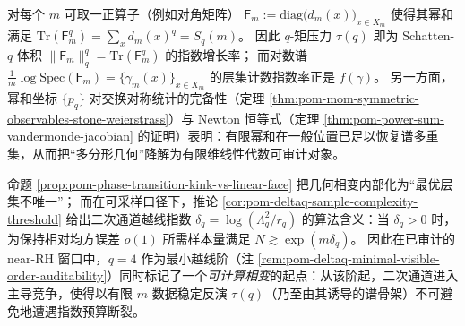 \begin{remark}\label{rem:pom-matrixization-spectrum-density-schatten-det}
对每个 \(m\) 可取一正算子（例如对角矩阵）
\(
\mathsf F_m:=\mathrm{diag}\bigl(d_m(x)\bigr)_{x\in X_m}
\)
使得其幂和满足
\(
\mathrm{Tr}(\mathsf F_m^q)=\sum_x d_m(x)^q=S_q(m)
\)。
因此 \(q\)-矩压力 \(\tau(q)\) 即为 Schatten-\(q\) 体积 \(\|\mathsf F_m\|_q^q=\mathrm{Tr}(\mathsf F_m^q)\) 的指数增长率；
而对数谱
\(
\frac{1}{m}\log\mathrm{Spec}(\mathsf F_m)=\{\gamma_m(x)\}_{x\in X_m}
\)
的层集计数指数率正是 \(f(\gamma)\)。
另一方面，幂和坐标 \(\{p_q\}\) 对交换对称统计的完备性（定理 \ref{thm:pom-mom-symmetric-observables-stone-weierstrass}）与 Newton 恒等式（定理 \ref{thm:pom-power-sum-vandermonde-jacobian} 的证明）表明：有限幂和在一般位置已足以恢复谱多重集，从而把“多分形几何”降解为有限维线性代数可审计对象。
\end{remark}

\begin{remark}\label{rem:pom-computational-phase-transition-deltaq}
命题 \ref{prop:pom-phase-transition-kink-vs-linear-face} 把几何相变内部化为“最优层集不唯一”；
而在可采样口径下，推论 \ref{cor:pom-deltaq-sample-complexity-threshold} 给出二次通道越线指数
\(\delta_q=\log(\Lambda_q^2/r_q)\) 的算法含义：当 \(\delta_q>0\) 时，为保持相对均方误差 \(o(1)\) 所需样本量满足 \(N\gtrsim \exp(m\delta_q)\)。
因此在已审计的 near-RH 窗口中，\(q=4\) 作为最小越线阶（注 \ref{rem:pom-deltaq-minimal-visible-order-auditability}）同时标记了一个\emph{可计算相变}的起点：从该阶起，二次通道进入主导竞争，使得以有限 \(m\) 数据稳定反演 \(\tau(q)\)（乃至由其诱导的谱骨架）不可避免地遭遇指数预算断裂。
\end{remark}

